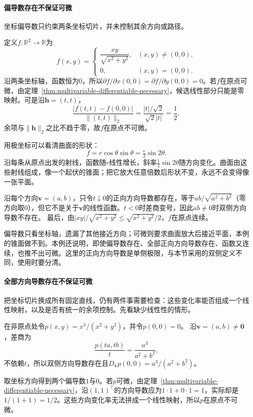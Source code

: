 \paragraph{偏导数存在不保证可微}
坐标偏导数只约束两条坐标切片，并未控制其余方向或路径。
\begin{example}[偏导数存在但不可微]
\label{ex:analysis-partials-not-differentiable}
定义$f:\mathbb{R}^2\to\mathbb{R}$为
\[
 f(x,y)=
 \begin{cases}
  \dfrac{xy}{\sqrt{x^2+y^2}}, & (x,y)\neq(0,0),\\[6pt]
  0, & (x,y)=(0,0).
 \end{cases}
\]
沿两条坐标轴，函数恒为$0$，所以$\partial f/\partial x(0,0)=\partial f/\partial y(0,0)=0$。若$f$在原点可微，由定理~\ref{thm:multivariable-differentiable-necessary}，候选线性部分只能是零映射。可是沿$\bm{h}=(t,t)$，
\[
 \frac{|f(t,t)-f(0,0)|}{\lVert(t,t)\rVert_2}
 =\frac{|t|/\sqrt{2}}{\sqrt{2}|t|}
 =\frac12,
\]
余项与$\lVert\bm{h}\rVert_2$之比不趋于零，故$f$在原点不可微。

用极坐标可以看清曲面的形状：
\[
 f=r\cos\theta\sin\theta=\tfrac r2\sin2\theta.
\]
沿每条从原点出发的射线，函数随$r$线性增长，斜率$\tfrac12\sin2\theta$随方向变化。曲面由这些射线组成，像一个起伏的锥面；把它放大任意倍数后形状不变，永远不会变得像一张平面。

沿每个方向$\bm v=(a,b)$，只令$t\downarrow0$的正向方向导数都存在，等于$ab/\sqrt{a^2+b^2}$（零方向取$0$），但它不是关于$\bm v$的线性函数。$t<0$时差商变号，因此$ab\neq0$时双侧方向导数不存在。
最后，由$|xy|/\sqrt{x^2+y^2}\leq\sqrt{x^2+y^2}/2$，$f$在原点连续。
\end{example}

偏导数只看坐标轴，遗漏了其他接近方向；可微则要求曲面放大后接近平面，本例的锥面做不到。本例还说明，即使偏导数存在、全部正向方向导数存在、函数又连续，也推不出可微。这里的正向方向导数是单侧极限，与本节采用的双侧定义不同，使用时要分清。

\paragraph{全部方向导数存在不保证可微}
把坐标切片换成所有固定直线，仍有两件事需要检查：这些变化率能否组成一个线性映射，以及是否有统一的余项控制。先看缺少线性性的情形。
\begin{example}[方向导数不构成线性映射]
\label{ex:multivariable-nonlinear-directional-derivatives}
在非原点处令$p(x,y)=x^3/(x^2+y^2)$，并令$p(0,0)=0$。
沿$\bm v=(a,b)\neq\bm0$，差商为
\[
 \frac{p(ta,tb)}t=\frac{a^3}{a^2+b^2},
\]
不依赖$t$，所以双侧方向导数存在且$D_{\bm v}p(0,0)=a^3/(a^2+b^2)$。

取坐标方向得到两个偏导数$1$与$0$。若$p$可微，由定理~\ref{thm:multivariable-differentiable-necessary}，沿$(1,1)^\top$的方向导数应为$1\cdot1+0\cdot1=1$，实际却是$1/(1+1)=1/2$。这些方向变化率无法拼成一个线性映射，所以$p$在原点不可微。
\end{example}


